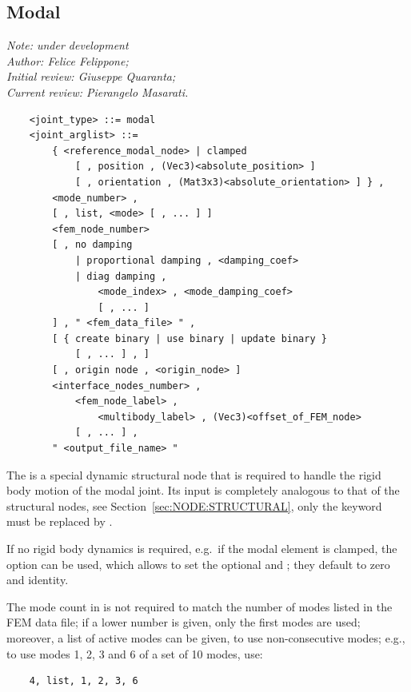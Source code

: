 \subsection{Modal}\label{sec:EL:STRUCT:JOINT:MODAL}
\emph{Note: under development \\
    Author: Felice Felippone; \\
    Initial review: Giuseppe Quaranta; \\
    Current review: Pierangelo Masarati.}

\begin{verbatim}
    <joint_type> ::= modal
    <joint_arglist> ::=
        { <reference_modal_node> | clamped
            [ , position , (Vec3)<absolute_position> ]
            [ , orientation , (Mat3x3)<absolute_orientation> ] } ,
        <mode_number> ,
        [ , list, <mode> [ , ... ] ]
        <fem_node_number> 
        [ , no damping 
            | proportional damping , <damping_coef>
            | diag damping , 
                <mode_index> , <mode_damping_coef> 
                [ , ... ] 
        ] , " <fem_data_file> " ,
        [ { create binary | use binary | update binary }
            [ , ... ] , ]
        [ , origin node , <origin_node> ]
        <interface_nodes_number> ,
            <fem_node_label> ,
                <multibody_label> , (Vec3)<offset_of_FEM_node>
            [ , ... ] ,
        " <output_file_name> "
\end{verbatim}
The  is a special dynamic structural node 
that is required to handle the rigid body motion of the modal joint.
Its input is completely analogous to that of the  structural
nodes, see Section~\ref{sec:NODE:STRUCTURAL}, only the keyword  
must be replaced by .

\noindent
If no rigid body dynamics is required, e.g.\ if the modal element
is clamped, the  option can be used, which allows
to set the optional  
and ; they default to zero and identity.

\noindent
The mode count in  is not required to match
the number of modes listed in the FEM data file; if a lower number
is given, only the first  modes are used;
moreover, a list of active modes can be given, to use non-consecutive
modes; e.g., to use modes 1, 2, 3 and 6 of a set of 10 modes, use:
\begin{verbatim}
	4, list, 1, 2, 3, 6
\end{verbatim}

